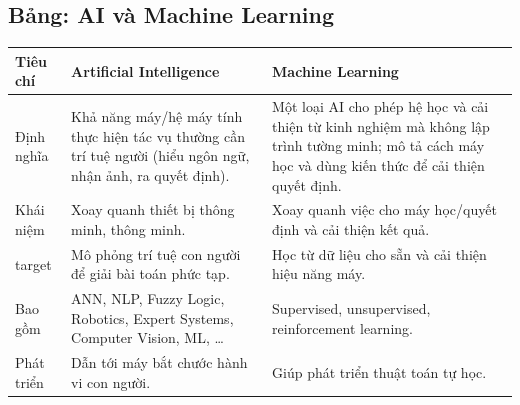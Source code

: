 \subsection{Bảng: AI và Machine Learning}

\begin{vidu}[title={Khác biệt quan trọng}]
\begin{tabularx}{\linewidth}{>{\raggedright\arraybackslash}p{2.4cm}XX}
\textbf{Tiêu chí} & \textbf{Artificial Intelligence} & \textbf{Machine Learning} \\
\midrule
Định nghĩa &
Khả năng máy/hệ máy tính thực hiện tác vụ thường cần trí tuệ người (hiểu ngôn ngữ, nhận ảnh, ra quyết định). &
Một loại AI cho phép hệ học và cải thiện từ kinh nghiệm mà không lập trình tường minh; mô tả cách máy học và dùng kiến thức để cải thiện quyết định. \\
Khái niệm &
Xoay quanh thiết bị thông minh, thông minh. &
Xoay quanh việc cho máy học/quyết định và cải thiện kết quả. \\
target &
Mô phỏng trí tuệ con người để giải bài toán phức tạp. &
Học từ dữ liệu cho sẵn và cải thiện hiệu năng máy. \\
Bao gồm &
ANN, NLP, Fuzzy Logic, Robotics, Expert Systems, Computer Vision, ML, \ldots &
Supervised, unsupervised, reinforcement learning. \\
Phát triển &
Dẫn tới máy bắt chước hành vi con người. &
Giúp phát triển thuật toán tự học. \\
\end{tabularx}
\end{vidu}
